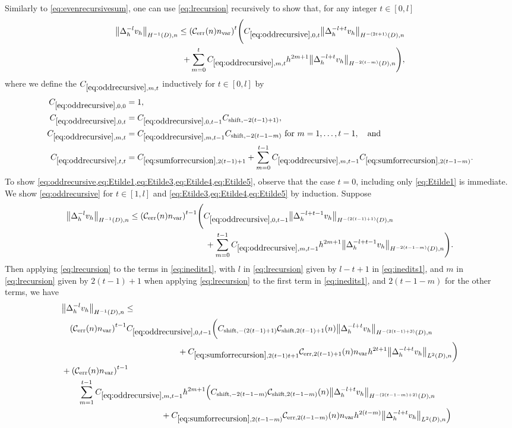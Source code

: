 Similarly to \cref{eq:evenrecursivesum}, one can use \cref{eq:lrecursion} recursively to show that, for any integer $t \in [0,l]$
\begin{align}
\NHnfn{-1}{D}{\Deltah^{-l}\vh} \leq \mleft(\En \nvar\mright)^t\Bigg(\Etildefn{0,t} \NHnfn{-(2t+1)}{D}{\Deltah^{-l+t}\vh}\nonumber\\
+ \sum_{m=0}^t \Etildefn{m,t} h^{2m+1}  \NHnfn{-2(t-m)}{D}{\Deltah^{-l+t}\vh}\Bigg),\label{eq:oddrecursive}
\end{align}
where  we define the $\Etildefn{m,t}$ inductively for $t \in [0,l]$ by
\begin{align}
\label{eq:Etilde1}\Etildefn{0,0} &= 1,\\
\label{eq:Etilde3}\Etildefn{0,t} &= \Etildefn{0,t-1}\Cshiftfn{2(t-1)+1)},\\
\label{eq:Etilde4}\Etildefn{m,t} &= \Etildefn{m,t-1}\Cshiftfn{2(t-1-m)}\tfor m = 1,\ldots,t-1,\quad\text{and}\\
\label{eq:Etilde5}\Etildefn{t,t} &= \Csumrecfn{2(t-1)+1} + \sum_{m=0}^{t-1}\Etildefn{m,t-1}\Csumrecfn{2(t-1-m)}.
\end{align}
To show \cref{eq:oddrecursive,eq:Etilde1,eq:Etilde3,eq:Etilde4,eq:Etilde5}, observe that the case $t=0$, including only \cref{eq:Etilde1} is immediate. We show \cref{eq:oddrecursive} for $t \in [1,l]$ and \cref{eq:Etilde3,eq:Etilde4,eq:Etilde5} by induction. Suppose %
\begin{align}
  \NHnfn{-1}{D}{\Deltah^{-l}\vh} \leq \mleft(\En \nvar\mright)^{t-1}&\Bigg(\Etildefn{0,t-1} \NHnfn{-(2(t-1)+1)}{D}{\Deltah^{-l+t-1}\vh}\nonumber\\
& \quad + \sum_{m=0}^{t-1} \Etildefn{m,t-1} h^{2m+1}  \NHnfn{-2(t-1-m)}{D}{\Deltah^{-l+t-1}\vh}\Bigg).\label{eq:inedits1}
\end{align}
Then applying \cref{eq:lrecursion} to the terms in \cref{eq:inedits1}, with $l$ in \cref{eq:lrecursion} given by $l-t+1$ in \cref{eq:inedits1}, and $m$ in \cref{eq:lrecursion} given by $2(t-1)+1$ when applying \cref{eq:lrecursion} to the first term in \cref{eq:inedits1}, and $2(t-1-m)$ for the other terms, we have
\begin{align}
  &\NHnfn{-1}{D}{\Deltah^{-l}\vh} \leq\nonumber\\
  &\quad\mleft(\En \nvar\mright)^{t-1} \Etildefn{0,t-1}\bigg(\Cshiftfn{(2(t-1)+1)} \shiftn{2(t-1)+1}\NHnfn{-(2(t-1)+3)}{D}{\Deltah^{-l + t}\vh}\nonumber\\
    &\quad\quad\quad\quad\quad\quad\quad\quad\quad\quad\quad\quad\quad\quad+\Csumrecfn{2(t-1)t+1} \errn{2(t-1)+1}\nvar h^{2t+1} \NLtDn{\Deltah^{-l + t}\vh}\bigg)\nonumber\\
  &+ \mleft(\En \nvar\mright)^{t-1}\nonumber\\
  &\quad\quad\sum_{m=1}^{t-1} \Etildefn{m,t-1} h^{2m+1}\Big(\Cshiftfn{2(t-1-m)} \shiftn{2(t-1-m)}\NHnfn{-(2(t-1-m)+2)}{D}{\Deltah^{-l + t}\vh}\nonumber\\
  &\quad\quad\quad\quad\quad\quad\quad\quad\quad\quad\quad\quad+  \Csumrecfn{2(t-1-m)}\errn{2(t-1-m)}\nvar h^{2(t-m)} \NLtDn{\Deltah^{-l + t}\vh}\Big)\label{eq:verylongeq}
\end{align}
